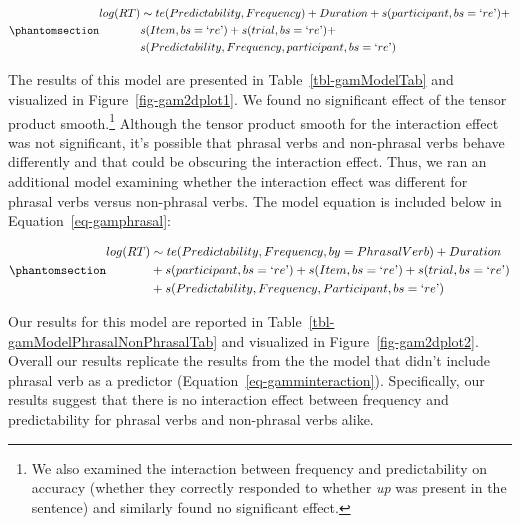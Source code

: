 \documentclass[
  12pt,
  letterpaper,
]{scrreport}
\begin{document}
\begin{equation}\phantomsection\label{eq-gamminteraction}{
\begin{aligned}log(RT) & \sim te(Predictability, Frequency) + Duration + s(participant, bs = \text{`}re\text{'}) + \\ & s(Item, bs = \text{`}re\text{'}) + s(trial, bs = \text{`}re\text{'}) + \\ & s(Predictability, Frequency, participant, bs = \text{`}re\text{'}) \end{aligned}
}\end{equation}

The results of this model are presented in Table~\ref{tbl-gamModelTab}
and visualized in Figure~\ref{fig-gam2dplot1}. We found no significant
effect of the tensor product smooth.\footnote{We also examined the
  interaction between frequency and predictability on accuracy (whether
  they correctly responded to whether \emph{up} was present in the
  sentence) and similarly found no significant effect.} Although the
tensor product smooth for the interaction effect was not significant,
it's possible that phrasal verbs and non-phrasal verbs behave
differently and that could be obscuring the interaction effect. Thus, we
ran an additional model examining whether the interaction effect was
different for phrasal verbs versus non-phrasal verbs. The model equation
is included below in Equation~\ref{eq-gamphrasal}:

\begin{equation}\phantomsection\label{eq-gamphrasal}{
\begin{aligned}log(RT) & \sim te(Predictability, Frequency, by = PhrasalVerb) + Duration \\ & + s(participant, bs = \text{`}re\text{'}) + s(Item, bs = \text{`}re\text{'})  + s(trial, bs = \text{`}re\text{'}) \\ & + s(Predictability, Frequency, Participant, bs = \text{`}re\text{'}) \end{aligned}
}\end{equation}

Our results for this model are reported in
Table~\ref{tbl-gamModelPhrasalNonPhrasalTab} and visualized in
Figure~\ref{fig-gam2dplot2}. Overall our results replicate the results
from the the model that didn't include phrasal verb as a predictor
(Equation~\ref{eq-gamminteraction}). Specifically, our results suggest
that there is no interaction effect between frequency and predictability
for phrasal verbs and non-phrasal verbs alike.
\end{document}
